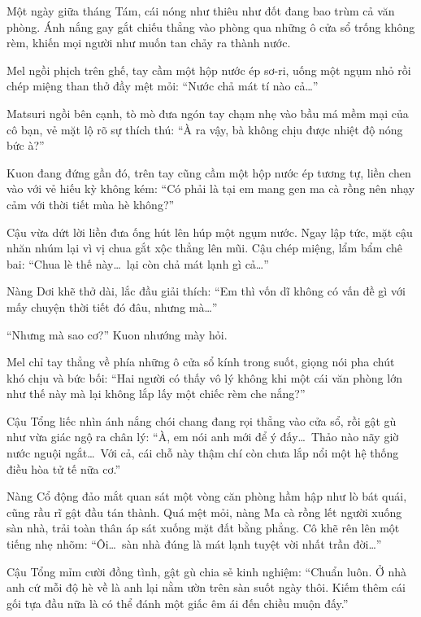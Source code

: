 \documentclass[../main.tex]{subfiles}
\begin{document}
\color{black}

Một ngày giữa tháng Tám, cái nóng như thiêu như đốt đang bao trùm cả văn phòng. Ánh nắng gay gắt chiếu thẳng vào phòng qua những ô cửa sổ trống không rèm, khiến mọi người như muốn tan chảy ra thành nước.

Mel ngồi phịch trên ghế, tay cầm một hộp nước ép sơ-ri, uống một ngụm nhỏ rồi chép miệng than thở đầy mệt mỏi:
``Nước chả mát tí nào cả\dots''

Matsuri ngồi bên cạnh, tò mò đưa ngón tay chạm nhẹ vào bầu má mềm mại của cô bạn, vẻ mặt lộ rõ sự thích thú:
``À ra vậy, bà không chịu được nhiệt độ nóng bức à?''


Kuon đang đứng gần đó, trên tay cũng cầm một hộp nước ép tương tự, liền chen vào với vẻ hiếu kỳ không kém:
``Có phải là tại em mang gen ma cà rồng nên nhạy cảm với thời tiết mùa hè không?''

Cậu vừa dứt lời liền đưa ống hút lên húp một ngụm nước. Ngay lập tức, mặt cậu nhăn nhúm lại vì vị chua gắt xộc thẳng lên mũi. Cậu chép miệng, lẩm bẩm chê bai:
``Chua lè thế này\dots\ lại còn chả mát lạnh gì cả\dots''

Nàng Dơi khẽ thở dài, lắc đầu giải thích:
``Em thì vốn dĩ không có vấn đề gì với mấy chuyện thời tiết đó đâu, nhưng mà\dots''

``Nhưng mà sao cơ?'' Kuon nhướng mày hỏi.

Mel chỉ tay thẳng về phía những ô cửa sổ kính trong suốt, giọng nói pha chút khó chịu và bức bối:
``Hai người có thấy vô lý không khi một cái văn phòng lớn như thế này mà lại không lắp lấy một chiếc rèm che nắng?''

Cậu Tổng liếc nhìn ánh nắng chói chang đang rọi thẳng vào cửa sổ, rồi gật gù như vừa giác ngộ ra chân lý:
``À, em nói anh mới để ý đấy\dots\ Thảo nào nãy giờ nước nguội ngắt\dots\ Với cả, cái chỗ này thậm chí còn chưa lắp nổi một hệ thống điều hòa tử tế nữa cơ.''

Nàng Cổ động đảo mắt quan sát một vòng căn phòng hầm hập như lò bát quái, cũng rầu rĩ gật đầu tán thành. Quá mệt mỏi, nàng Ma cà rồng lết người xuống sàn nhà, trải toàn thân áp sát xuống mặt đất bằng phẳng. Cô khẽ rên lên một tiếng nhẹ nhõm:
``Ôi\dots\ sàn nhà đúng là mát lạnh tuyệt vời nhất trần đời\dots''


Cậu Tổng mỉm cười đồng tình, gật gù chia sẻ kinh nghiệm:
``Chuẩn luôn. Ở nhà anh cứ mỗi độ hè về là anh lại nằm ườn trên sàn suốt ngày thôi. Kiếm thêm cái gối tựa đầu nữa là có thể đánh một giấc êm ái đến chiều muộn đấy.''
\end{document}
